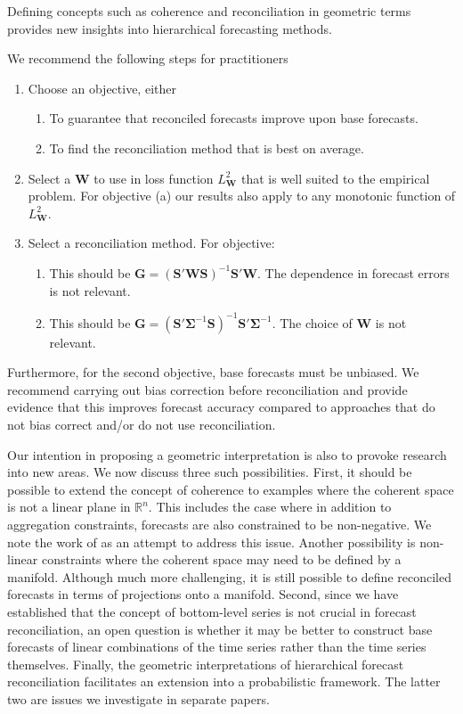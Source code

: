 \documentclass[12pt]{article}
\theoremstyle{definition}
\begin{document}
Defining concepts such as coherence and reconciliation in geometric terms provides new insights into hierarchical forecasting methods. {\color{blue} We recommend the following steps for practitioners
\begin{enumerate}
	\item Choose an objective, either
	\begin{enumerate}
		\item To guarantee that reconciled forecasts improve upon base forecasts.
		\item To find the reconciliation method that is best on average.
	\end{enumerate}
    \item Select a ${\bm W}$ to use in loss function $L^2_{\bm W}$ that is well suited to the empirical problem.  For objective (a) our results also apply to any monotonic function of $L^2_{\bm W}$.
    \item Select a reconciliation method.  For objective:
    \begin{enumerate}
    	\item This should be ${\bm G}=({\bm S}'\bm{W}\bm{S})^{-1}\bm{S}'\bm{W}$. The dependence in forecast errors is not relevant.
    	\item This should be ${\bm G}=({\bm S}'\bm{\Sigma}^{-1}\bm{S})^{-1}\bm{S}'\bm{\Sigma}^{-1}$. The choice of ${\bm W}$ is not relevant.
    \end{enumerate}
\end{enumerate}}
{\color{blue} Furthermore, for the second objective, base forecasts must be unbiased.  We recommend carrying out} bias correction before reconciliation {\color{blue} and provide evidence that this} improves forecast accuracy compared to approaches that do not bias correct and/or do not use reconciliation. 

Our intention in proposing a geometric interpretation is also to provoke research into new areas. We now discuss three such possibilities.  First, it should be possible to extend the concept of coherence {\color{blue}to examples where the coherent space is not a linear plane in $\mathbb{R}^n$.  This includes the case where in addition to aggregation constraints, forecasts are also constrained to be non-negative. We note the work of \cite{wickramasuriya2019optimal} as an attempt to address this issue.  Another possibility is} non-linear constraints where the coherent space may need to be defined by a manifold. Although much more challenging, it is still possible to define reconciled forecasts in terms of projections onto a manifold. Second, since we have established that the concept of bottom-level series is not crucial in forecast reconciliation, an open question is whether it may be better to construct base forecasts of linear combinations of the time series rather than the time series themselves. Finally, the geometric interpretations of hierarchical forecast reconciliation facilitates an extension into a probabilistic framework. The latter two are issues we investigate in separate papers.
\end{document}
